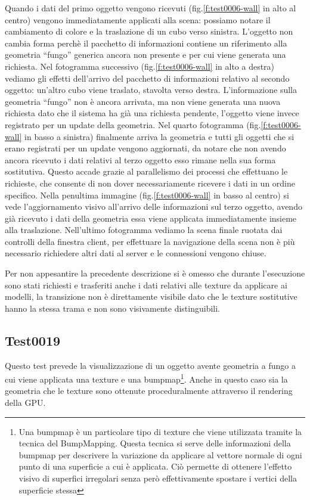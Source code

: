 Quando i dati del primo oggetto vengono ricevuti (fig.\ref{f:test0006-wall} in alto al centro) vengono immediatamente applicati alla scena: possiamo notare il cambiamento di colore e la traslazione di un cubo verso sinistra. 
L'oggetto non cambia forma perch\`e il pacchetto di informazioni contiene un riferimento alla geometria ``fungo'' generica ancora non presente e per cui viene generata una richiesta. 
Nel fotogramma successivo (fig.\ref{f:test0006-wall} in alto a destra) vediamo gli effetti dell'arrivo del pacchetto di informazioni relativo al secondo oggetto: un'altro cubo viene traslato, stavolta verso destra. 
L'informazione sulla geometria ``fungo'' non \`e ancora arrivata, ma non viene generata una nuova richiesta dato che il sistema ha gi\`a una richiesta pendente, l'oggetto viene invece registrato per un update della geometria.
Nel quarto fotogramma (fig.\ref{f:test0006-wall} in basso a sinistra) finalmente arriva la geometria e tutti gli oggetti che si erano registrati per un update vengono aggiornati, da notare che non avendo ancora ricevuto i dati relativi al terzo oggetto esso rimane nella sua forma sostitutiva. Questo accade grazie al parallelismo dei processi che effettuano le richieste, che consente di non dover necessariamente ricevere i dati in un ordine specifico.
Nella penultima immagine (fig.\ref{f:test0006-wall} in basso al centro) si vede l'aggiornamento visivo all'arrivo delle informazioni sul terzo oggetto, avendo gi\`a ricevuto i dati della geometria essa viene applicata immediatamente insieme alla traslazione. Nell'ultimo fotogramma vediamo la scena finale ruotata dai controlli della finestra client, per effettuare la navigazione della scena non \`e pi\`u necessario richiedere altri dati al server e le connessioni vengono chiuse.

Per non appesantire la precedente descrizione si \`e omesso che durante l'esecuzione sono stati richiesti e trasferiti anche i dati relativi alle texture da applicare ai modelli, la transizione non \`e direttamente visibile dato che le texture sostitutive hanno la stessa trama e non sono visivamente distinguibili.

\subsection{Test0019}
Questo test prevede la visualizzazione di un oggetto avente geometria a fungo a cui viene applicata una texture e una bumpmap\footnote{Una bumpmap \`e un particolare tipo di texture che viene utilizzata tramite la tecnica del BumpMapping. Questa tecnica si serve delle informazioni della bumpmap per descrivere la variazione da applicare al vettore normale di ogni punto di una superficie a cui \`e applicata. Ci\`o permette di ottenere l'effetto visivo di superfici irregolari senza per\`o effettivamente spostare i vertici della superficie stessa}. Anche in questo caso sia la geometria che le texture sono ottenute proceduralmente attraverso il rendering della \ac{GPU}.

